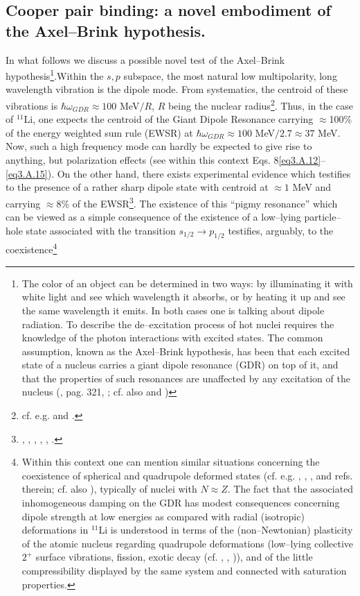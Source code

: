 \subsection{Cooper pair binding: a novel embodiment of the Axel--Brink hypothesis.}\label{sect1F1}
In what follows we discuss a possible novel test of the Axel--Brink hypothesis\footnote{The color of an object can be determined in two ways: by illuminating it with white light and see which wavelength it absorbs, or by heating it up and see the same wavelength it emits. In both cases one is talking about dipole radiation. To describe the de--excitation process of hot nuclei requires the knowledge of the photon interactions with excited states. The common assumption, known as the Axel--Brink hypothesis, has been that each excited state of a nucleus carries a giant dipole resonance (GDR) on top of it, and that the properties of such resonances are unaffected by any excitation of the nucleus (\cite{Brink:55}, \cite{Lynn:68} pag. 321, \cite{Axel:62}; cf. also \cite{Bertsch:86} and \cite{Bortignon:98})}.Within the $s,p$ subspace, the most natural low multipolarity, long wavelength vibration is the dipole mode. From systematics, the centroid of these vibrations is $\hbar \omega_{GDR}\approx 100$ MeV$/R$, $R$ being the nuclear radius\footnote{cf. e.g. \cite{Bortignon:98} and \cite{Bertsch:05}.}. Thus, in the case of $^{11}$Li, one expects the centroid of the Giant Dipole Resonance carrying $\approx$100\% of the energy weighted sum rule (EWSR) at $\hbar \omega_{GDR}\approx 100$ MeV$/2.7\approx 37$ MeV. Now, such a high frequency mode can hardly be expected to give rise to anything, but polarization effects (see within this context Eqs. 8\ref{eq3.A.12}--\ref{eq3.A.15}). On the other hand, there exists experimental evidence which testifies to the presence of a rather sharp dipole state with centroid at $\approx 1$ MeV and carrying $\approx 8$\% of the EWSR\footnote{\cite{Zinser:97}, \cite{Nakamura:06}, \cite{Shimoura:95}, \cite{Ieki:93}, \cite{Sackett:93}, \cite{Kanungo:15}.}. The existence of this ``pigmy resonance'' which can be viewed as a simple consequence of the existence of a low--lying particle--hole state associated with the transition $s_{1/2}\rightarrow p_{1/2}$ testifies, arguably, to the coexistence\footnote{Within this context one can mention similar situations concerning the coexistence of spherical and quadrupole deformed states (cf. e.g. \cite{Wimmer:10}, \cite{Federman:65}, \cite{Federman:66}, \cite{Donau:67} and refs. therein; cf. also \cite{Bohr:63}), typically of nuclei with $N\approx Z$. The fact that the associated inhomogeneous damping on the GDR has modest consequences concerning dipole strength at low energies as compared with radial (isotropic) deformations in $^{11}$Li is understood in terms of the (non--Newtonian) plasticity of the atomic nucleus regarding quadrupole deformations (low--lying collective $2^+$ surface vibrations, fission, exotic decay (cf. \cite{Barranco:88}, \cite{Barranco:89}, \cite{Bertsch:87})), and of the little compressibility displayed by the same system and connected with saturation properties.} 
